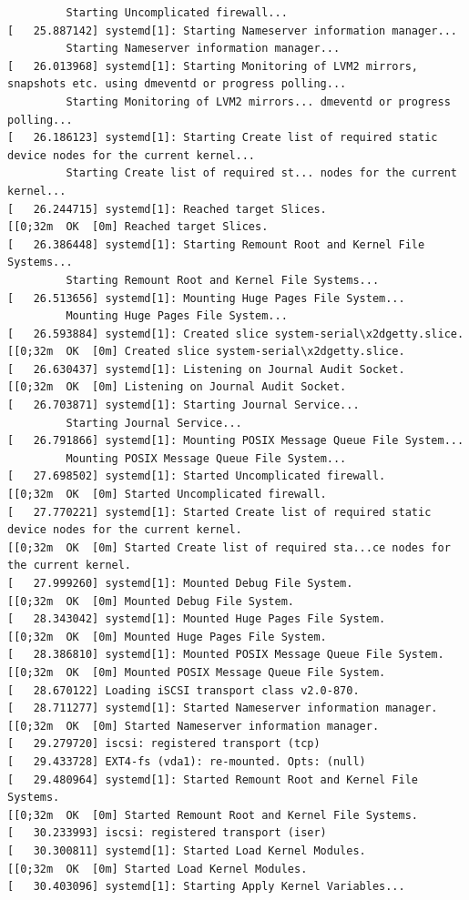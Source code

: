 \documentclass[12pt]{article}
\begin{document}
\begin{verbatim}
         Starting Uncomplicated firewall...
[   25.887142] systemd[1]: Starting Nameserver information manager...
         Starting Nameserver information manager...
[   26.013968] systemd[1]: Starting Monitoring of LVM2 mirrors, snapshots etc. using dmeventd or progress polling...
         Starting Monitoring of LVM2 mirrors... dmeventd or progress polling...
[   26.186123] systemd[1]: Starting Create list of required static device nodes for the current kernel...
         Starting Create list of required st... nodes for the current kernel...
[   26.244715] systemd[1]: Reached target Slices.
[[0;32m  OK  [0m] Reached target Slices.
[   26.386448] systemd[1]: Starting Remount Root and Kernel File Systems...
         Starting Remount Root and Kernel File Systems...
[   26.513656] systemd[1]: Mounting Huge Pages File System...
         Mounting Huge Pages File System...
[   26.593884] systemd[1]: Created slice system-serial\x2dgetty.slice.
[[0;32m  OK  [0m] Created slice system-serial\x2dgetty.slice.
[   26.630437] systemd[1]: Listening on Journal Audit Socket.
[[0;32m  OK  [0m] Listening on Journal Audit Socket.
[   26.703871] systemd[1]: Starting Journal Service...
         Starting Journal Service...
[   26.791866] systemd[1]: Mounting POSIX Message Queue File System...
         Mounting POSIX Message Queue File System...
[   27.698502] systemd[1]: Started Uncomplicated firewall.
[[0;32m  OK  [0m] Started Uncomplicated firewall.
[   27.770221] systemd[1]: Started Create list of required static device nodes for the current kernel.
[[0;32m  OK  [0m] Started Create list of required sta...ce nodes for the current kernel.
[   27.999260] systemd[1]: Mounted Debug File System.
[[0;32m  OK  [0m] Mounted Debug File System.
[   28.343042] systemd[1]: Mounted Huge Pages File System.
[[0;32m  OK  [0m] Mounted Huge Pages File System.
[   28.386810] systemd[1]: Mounted POSIX Message Queue File System.
[[0;32m  OK  [0m] Mounted POSIX Message Queue File System.
[   28.670122] Loading iSCSI transport class v2.0-870.
[   28.711277] systemd[1]: Started Nameserver information manager.
[[0;32m  OK  [0m] Started Nameserver information manager.
[   29.279720] iscsi: registered transport (tcp)
[   29.433728] EXT4-fs (vda1): re-mounted. Opts: (null)
[   29.480964] systemd[1]: Started Remount Root and Kernel File Systems.
[[0;32m  OK  [0m] Started Remount Root and Kernel File Systems.
[   30.233993] iscsi: registered transport (iser)
[   30.300811] systemd[1]: Started Load Kernel Modules.
[[0;32m  OK  [0m] Started Load Kernel Modules.
[   30.403096] systemd[1]: Starting Apply Kernel Variables...

\end{verbatim}
\end{document}
